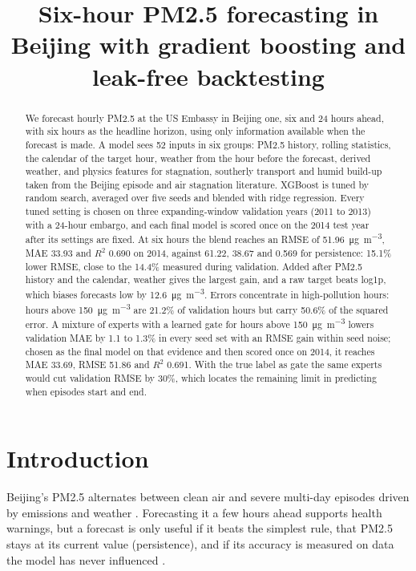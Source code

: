 \documentclass[conference]{IEEEtran}
\newcommand{\ugm}{\si{\micro\gram\per\cubic\metre}}
\begin{document}
\title{Six-hour PM2.5 forecasting in Beijing with gradient boosting and leak-free backtesting}

\author{
}

\maketitle

\begin{abstract}
We forecast hourly PM2.5 at the US Embassy in Beijing one, six and 24 hours ahead, with six hours as the headline horizon, using only information available when the forecast is made. A model sees 52 inputs in six groups: PM2.5 history, rolling statistics, the calendar of the target hour, weather from the hour before the forecast, derived weather, and physics features for stagnation, southerly transport and humid build-up taken from the Beijing episode and air stagnation literature. XGBoost is tuned by random search, averaged over five seeds and blended with ridge regression. Every tuned setting is chosen on three expanding-window validation years (2011 to 2013) with a 24-hour embargo, and each final model is scored once on the 2014 test year after its settings are fixed. At six hours the blend reaches an RMSE of 51.96~\ugm, MAE 33.93 and $R^2$ 0.690 on 2014, against 61.22, 38.67 and 0.569 for persistence: 15.1\% lower RMSE, close to the 14.4\% measured during validation. Added after PM2.5 history and the calendar, weather gives the largest gain, and a raw target beats log1p, which biases forecasts low by 12.6~\ugm. Errors concentrate in high-pollution hours: hours above 150~\ugm{} are 21.2\% of validation hours but carry 50.6\% of the squared error. A mixture of experts with a learned gate for hours above 150~\ugm{} lowers validation MAE by 1.1 to 1.3\% in every seed set with an RMSE gain within seed noise; chosen as the final model on that evidence and then scored once on 2014, it reaches MAE 33.69, RMSE 51.86 and $R^2$ 0.691. With the true label as gate the same experts would cut validation RMSE by 30\%, which locates the remaining limit in predicting when episodes start and end.
\end{abstract}

\section{Introduction}
Beijing's PM2.5 alternates between clean air and severe multi-day episodes driven by emissions and weather \cite{liang2015}. Forecasting it a few hours ahead supports health warnings, but a forecast is only useful if it beats the simplest rule, that PM2.5 stays at its current value (persistence), and if its accuracy is measured on data the model has never influenced \cite{tashman2000,kaufman2012}.
\end{document}
